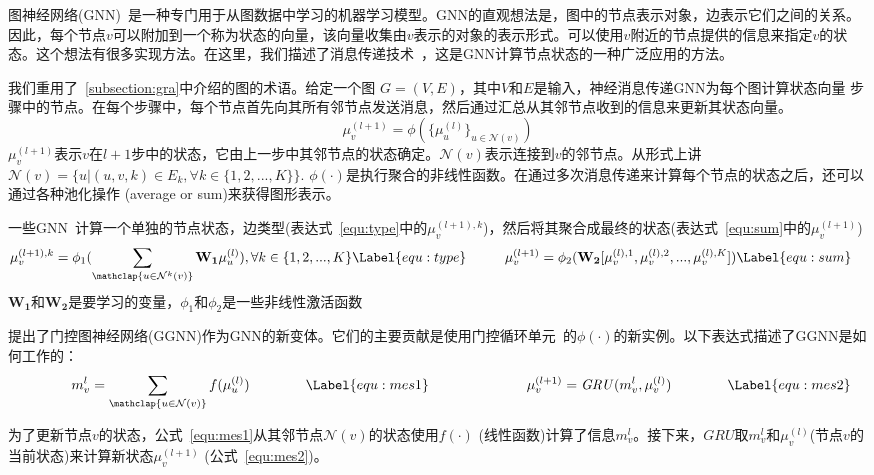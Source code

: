图神经网络(GNN)~\cite{gori2005new}是一种专门用于从图数据中学习的机器学习模型。GNN的直观想法是，图中的节点表示对象，边表示它们之间的关系。因此，每个节点$v$可以附加到一个称为状态的向量，该向量收集由$v$表示的对象的表示形式。可以使用$v$附近的节点提供的信息来指定$v$的状态。这个想法有很多实现方法。在这里，我们描述了消息传递技术~\cite{Gilmer10}，这是GNN计算节点状态的一种广泛应用的方法。

我们重用了~\ref{subsection:gra}中介绍的图的术语。给定一个图 ${G}\! =\! ({V}, {E})$，其中${V}$和${E}$是输入，神经消息传递GNN为每个图计算状态向量
步骤中的节点。在每个步骤中，每个节点首先向其所有邻节点发送消息，然后通过汇总从其邻节点收到的信息来更新其状态向量。
\begin{equation}
\mu^{(l+1)}_{v} = \phi(\{\mu^{(l)}_{u}\}_{u \in \mathcal{N}(v)})  \label{equ:h} %
\end{equation}
$\mu^{(l+1)}_{v}$表示$v$在$l+1$步中的状态，它由上一步中其邻节点的状态确定。$\mathcal{N}{(v)}$表示连接到$v$的邻节点。从形式上讲$\mathcal{N}{(v)} = \{u|(u,v,k) \in {E}_k, \forall k \in \{1,2,...,K\}\}$. $\phi(\cdot)$是执行聚合的非线性函数。在通过多次消息传递来计算每个节点的状态之后，还可以通过各种池化操作 (\eg average or sum)来获得图形表示。

一些GNN~\cite{Si10}计算一个单独的节点状态\wrt，边类型(\ie 表达式~\ref{equ:type}中的$\mu^{(l+1), k}_{v}$)，然后将其聚合成最终的状态(\ie 表达式~\ref{equ:sum}中的$\mu^{(l+1)}_{v}$)
\begin{align*}
\mu^{(l+1), k}_{v} &= \phi_1(\sum_{\mathclap{u \in \mathcal{N}^{k}{(v)}}} \mathbf{W_1} \mu_u^{(l)}), \forall k \in \{1,2,...,K\} \Label{equ:type} &\;\;\;\;\;\;\,
\mu^{(l+1)}_{v} &= \phi_2(\mathbf{W_2}[ \mu_v^{(l), 1}, \mu_v^{(l), 2}, ..., \mu_v^{(l), K}]) \Label{equ:sum}
\end{align*}
$\mathbf{W_1}$和$\mathbf{W_2}$是要学习的变量，$\phi_1$和$\phi_2$是一些非线性激活函数

\citet{li2015gated}提出了门控图神经网络(GGNN)作为GNN的新变体。它们的主要贡献是使用门控循环单元~\cite{cho-cho2014learning}的$\phi(\cdot)$的新实例。以下表达式描述了GGNN是如何工作的：
\begin{align*}
\qquad\qquad\,\,
{m}_v^l &= \sum_{\mathclap{u \in \mathcal{N}{(v)}}} f(\mu_{u}^{(l)}) \qquad\qquad\Label{equ:mes1} & 
\qquad\qquad\qquad
\mu^{(l+1)}_{v} &= \mathit{GRU}({m}_v^l, \mu^{(l)}_{v})\qquad\qquad\Label{equ:mes2}
\end{align*}

为了更新节点$v$的状态，公式~\ref{equ:mes1}从其邻节点$\mathcal{N}{(v)}$的状态使用$f(\cdot)$ (\eg 线性函数)计算了信息${m}_v^l$。接下来，$GRU$取${m}_v^l$和$\mu^{(l)}_{v}$(节点$v$的当前状态)来计算新状态$\mu^{(l+1)}_{v}$ (公式~\ref{equ:mes2})。

